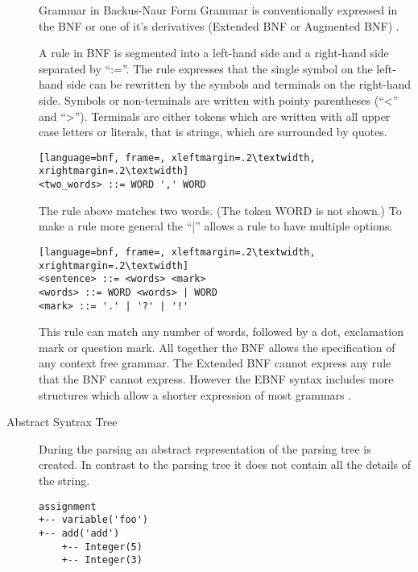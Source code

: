 \documentclass{scrartcl}
\begin{document}
\begin{description}
        \begin{info}{Grammar in Backus-Naur Form}
Grammar is conventionally expressed in the BNF or one of it's
derivatives (Extended BNF or Augmented BNF) \cite{aho2007compiler}.

A rule in BNF is segmented into a left-hand side and a right-hand side
separated by ``:=''. The rule expresses that the single symbol on the left-hand side
can be rewritten by the symbols and terminals on the right-hand side. Symbols
or non-terminals are written with pointy parentheses (``<'' and ``>'').
Terminals are either tokens which are written with all upper case letters or
literals, that is strings, which are surrounded by quotes.
\vspace{0.25cm}
\begin{lstlisting}[language=bnf, frame=, xleftmargin=.2\textwidth, xrightmargin=.2\textwidth]
<two_words> ::= WORD ',' WORD
\end{lstlisting}
\vspace{0.25cm}
The rule above matches two words. (The token WORD is not shown.) To make a rule
more general the ``|'' allows a rule to have multiple options.
\vspace{0.25cm}
\begin{lstlisting}[language=bnf, frame=, xleftmargin=.2\textwidth, xrightmargin=.2\textwidth]
<sentence> ::= <words> <mark>
<words> ::= WORD <words> | WORD
<mark> ::= '.' | '?' | '!'
\end{lstlisting}
\vspace{0.25cm}
This rule can match any number of words, followed by a dot, exclamation mark or
question mark. All together the BNF allows the specification of any
context free grammar. The Extended BNF cannot express any rule that the BNF
cannot express. However the EBNF syntax includes more structures which
allow a shorter expression of most grammars \cite{standard1996ebnf}.
        \end{info}

    \item[Abstract Syntrax Tree] During the parsing an abstract representation
        of the parsing tree is created. In contrast to the parsing tree it does
        not contain all the details of the string.
        \begin{lstlisting}[language=yangtree, caption=Abstract Syntax Tree]
assignment
+-- variable('foo')
+-- add('add')
    +-- Integer(5)
    +-- Integer(3)
        \end{lstlisting}


\end{description}
\end{document}
